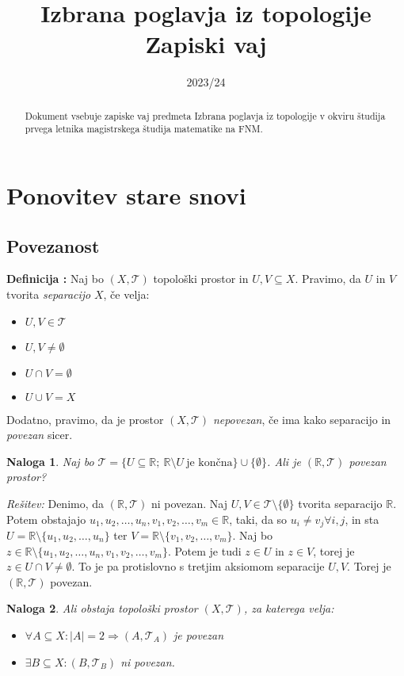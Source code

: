 \documentclass[a4paper, 10pt]{article}
\title{Izbrana poglavja iz topologije \\ Zapiski vaj}
\date{2023/24}
\newtheorem{nal}{Naloga}
\newcounter{defcount}
\newenvironment{definicija}{\begin{flushleft}\stepcounter{defcount}\textbf{Definicija \arabic{defcount}:}}{\hfill\end{flushleft}}
\newenvironment{resitev}{\begin{flushleft}\textit{Rešitev:}}{\hfill\end{flushleft}}
\newcommand{\abs}[1]{\ensuremath{\lvert #1 \rvert}}
\newcommand{\mth}[1]{\ensuremath{\mathbb{#1}}}
\newcommand{\R}{\mth{R}}
\newcommand{\pojem}[1]{\emph{#1}}
\begin{document}
	\maketitle
	\newpage
	\begin{abstract}
		\noindent Dokument vsebuje zapiske vaj predmeta Izbrana poglavja iz topologije v okviru študija prvega letnika magistrskega študija matematike na FNM.
	\end{abstract}
	\tableofcontents
	\newpage
	\section{Ponovitev stare snovi}
	\subsection{Povezanost}
	\begin{definicija}
		Naj bo $(X, \mathcal{T})$ topološki prostor in $U, V \subseteq X$. Pravimo, da $U$ in $V$ tvorita \pojem{separacijo} $X$, če velja: \begin{itemize}
			\item $U, V \in \mathcal{T}$
			\item $U,V \neq \emptyset$
			\item $U\cap V = \emptyset$
			\item $U\cup V = X$
		\end{itemize}
		Dodatno, pravimo, da je prostor $(X, \mathcal{T})$ \pojem{nepovezan}, če ima kako separacijo in \pojem{povezan} sicer.
	\end{definicija}
	\begin{nal}
		Naj bo $\mathcal{T} = \{U\subseteq \R;~ \R\setminus U~\text{je končna}\}\cup \{\emptyset\}$. Ali je $(\R, \mathcal{T})$ povezan prostor?
	\end{nal}
	\begin{resitev}
		Denimo, da $(\R, \mathcal{T})$ ni povezan. Naj $U, V\in \mathcal{T}\setminus\{\emptyset\}$ tvorita separacijo $\R$. Potem obstajajo $u_1, u_2, \ldots, u_n, v_1, v_2, \ldots, v_m \in \R$, taki, da so $u_i \neq v_j \forall i, j$, in sta $U = \R\setminus\{u_1, u_2, \ldots, u_n\}$ ter $V = \R\setminus\{v_1, v_2, \ldots, v_m\}$. Naj bo $z \in \R\setminus\{u_1, u_2, \ldots, u_n, v_1, v_2, \ldots, v_m\}$. Potem je tudi $z\in U$ in $z \in V$, torej je $z\in U\cap V \neq \emptyset$. To je pa protislovno s tretjim aksiomom separacije $U, V$. Torej je $(\R, \mathcal{T})$ povezan.
	\end{resitev}
	\begin{nal}
		Ali obstaja topološki prostor $(X, \mathcal{T})$, za katerega velja: \begin{itemize}
			\item $\forall A\subseteq X: \abs{A} = 2 \Rightarrow (A, \mathcal{T}_A)$ je povezan
			\item $\exists B \subseteq X: (B, \mathcal{T}_B)$ ni povezan.
		\end{itemize}
	\end{nal}
\end{document}
